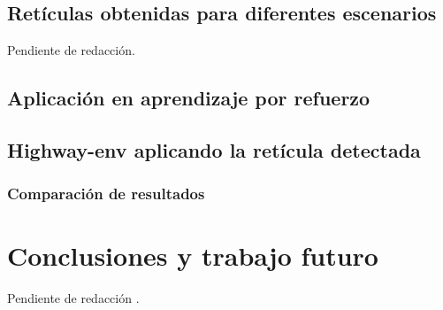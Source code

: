 \documentclass[10pt,letterpaper,final]{report}
\newlength{\spacing}
\newcommand{\nspace}[1]{\setlength{\baselineskip}{#1\spacing}}
\newenvironment{linespacing}[1]{\nspace{#1}}{}
\begin{document}
\begin{linespacing}{1.5}
\section{Retículas obtenidas para diferentes escenarios}
Pendiente de redacción.

\section{Aplicación en aprendizaje por refuerzo}


\section{Highway-env aplicando la retícula detectada}


\subsection{Comparación de resultados}

\clearpage
\chapter{Conclusiones y trabajo futuro}
Pendiente de redacción .

\end{linespacing}
\clearpage


\end{document}
